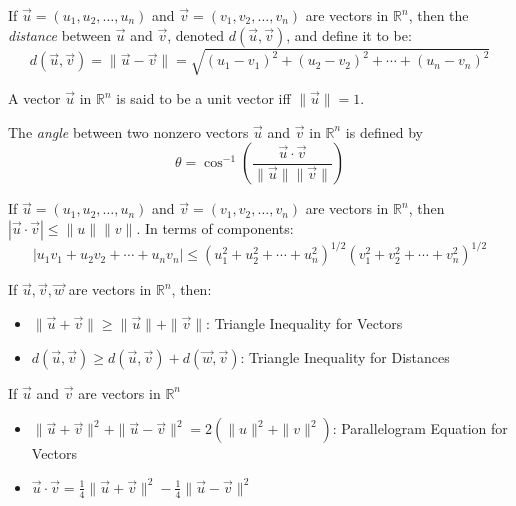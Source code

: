 \documentclass{report}
\begin{document}
		\begin{defn}[Distance]
			If $\vec{u}=(u_1,u_2,\dots,u_n)$ and $\vec{v}=(v_1,v_2,\dots,v_n)$ are vectors in $\mathbb{R}^n$, then the \emph{distance} between $\vec{u}$ and $\vec{v}$, denoted $d(\vec{u},\vec{v})$, and define it to be:
			\begin{displaymath}
				d(\vec{u},\vec{v})=\|\vec{u}-\vec{v}\|=\sqrt{(u_1-v_1)^2+(u_2-v_2)^2+\cdots+(u_n-v_n)^2}
			\end{displaymath}
		\end{defn}
		
		\begin{defn}
			A vector $\vec{u}$ in $\mathbb{R}^n$ is said to be a unit vector iff $\|\vec{u}\|=1$.
		\end{defn}
		
		\begin{defn}[Angle]
			The \emph{angle} between two nonzero vectors $\vec{u}$ and $\vec{v}$ in $\mathbb{R}^n$ is defined by
			\begin{displaymath}
				\theta=\cos^{-1}(\frac{\vec{u}\cdot\vec{v}}{\|\vec{u}\|\|\vec{v}\|})
			\end{displaymath}
		\end{defn}
		
		\begin{thm}
			If $\vec{u}=(u_1,u_2,\dots,u_n)$ and $\vec{v}=(v_1,v_2,\dots,v_n)$ are vectors in $\mathbb{R}^n$, then $\left|\vec{u}\cdot\vec{v}\right| \le \|u\|\|v\|$. In terms of components:
			\begin{displaymath}
				\left|u_1v_1+u_2v_2+\cdots+u_nv_n\right| \le \left(u_1^2+u_2^2+\cdots+u_n^2\right)^{1/2} \left(v_1^2+v_2^2+\cdots+v_n^2\right)^{1/2}
			\end{displaymath}
		\end{thm}
		
		\begin{thm}
			If $\vec{u}, \vec{v}, \vec{w}$ are vectors in $\mathbb{R}^n$, then:
			\begin{itemize}
				\item $\|\vec{u}+\vec{v}\| \ge \|\vec{u}\|+\|\vec{v}\|$: Triangle Inequality for Vectors
				\item $d(\vec{u},\vec{v}) \ge d(\vec{u},\vec{v})+d(\vec{w},\vec{v})$: Triangle Inequality for Distances
			\end{itemize}
		\end{thm}
		
		\begin{thm}
			If $\vec{u}$ and $\vec{v}$ are vectors in $\mathbb{R}^n$
			\begin{itemize}
				\item $\|\vec{u}+\vec{v}\|^2+\|\vec{u}-\vec{v}\|^2=2\left(\|u\|^2+\|v\|^2\right)$: Parallelogram Equation for Vectors
				\item $\vec{u}\cdot\vec{v}=\frac{1}{4}\|\vec{u}+\vec{v}\|^2-\frac{1}{4}\|\vec{u}-\vec{v}\|^2$
			\end{itemize}
		\end{thm}
		
\end{document}
